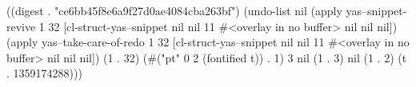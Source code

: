 
((digest . "ce6bb45f8e6a9f27d0ae4084cba263bf") (undo-list nil (apply yas--snippet-revive 1 32 [cl-struct-yas--snippet nil nil 11 #<overlay in no buffer> nil nil nil]) (apply yas--take-care-of-redo 1 32 [cl-struct-yas--snippet nil nil 11 #<overlay in no buffer> nil nil nil]) (1 . 32) (#("pt" 0 2 (fontified t)) . 1) 3 nil (1 . 3) nil (1 . 2) (t . 1359174288)))
